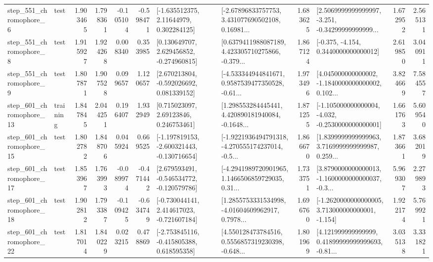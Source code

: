 \begin{tabular}{llrrrrllrlrr}
   step\_551\_chromophore\_6 &      test &      1.903465 &    1.798361 &     -0.105104 & -0.598471 &     [-1.635512375, 2.11644979, 0.302284125] &  [-2.67896833757753, 3.431077690502108, 0.16981... &       1.683625 &  [2.5069999999999997, -3.251, -0.34299999999999... &            1.672952 &          2.565131 \\
   step\_551\_chromophore\_8 &      test &      1.915927 &    1.924268 &      0.008340 &  0.353985 &    [0.130649707, 2.629456852, -0.274960815] &  [0.6379411988087189, 4.423305710275866, -0.379... &       1.867124 &               [-0.375, -4.154, 0.3440000000000012] &            2.619850 &          3.040911 \\
   step\_551\_chromophore\_9 &      test &      1.807871 &    1.907528 &      0.099657 &  1.120657 &    [2.670213804, -0.592026692, 0.081339152] &  [-4.533344944841671, 0.9587539477350528, -0.61... &       1.973496 &  [4.045000000000002, -1.1840000000000002, 0.102... &            3.824669 &          7.584557 \\
  step\_601\_chromophore\_13 &  training &      1.847845 &    2.044251 &      0.196407 &  1.932949 &      [0.715023097, 2.69123846, 0.246753461] &  [1.298553284445441, 4.420890181940084, -0.1648... &       1.871255 &  [-1.105000000000004, -4.032, -0.2530000000000001] &            1.661763 &          5.609540 \\
  step\_601\_chromophore\_15 &      test &      1.802782 &    1.848706 &      0.045924 &  0.669525 &  [-1.197819153, -2.600321443, -0.130716654] &  [-1.9221936494791318, -4.270555174237014, -0.5... &       1.866670 &  [1.8399999999999963, 3.7169999999999987, 0.259... &            1.873661 &          3.682019 \\
  step\_601\_chromophore\_17 &      test &      1.853967 &    1.763993 &     -0.089974 & -0.471442 &   [2.679593491, -0.546534772, -0.120579786] &  [-4.2941989720901965, 1.1466506859729035, 0.31... &       1.733751 &  [3.8790000000000013, -1.1600000000000037, -0.3... &            5.969307 &          2.279893 \\
  step\_601\_chromophore\_18 &      test &      1.902812 &    1.793387 &     -0.109425 & -0.634749 &   [-0.730044141, 2.414617023, -0.721607184] &  [1.2855753331534998, -4.01604609962917, 0.7978... &       1.696760 &   [-1.2620000000000005, 3.713000000000001, -1.154] &            1.922174 &          5.769921 \\
  step\_601\_chromophore\_22 &      test &      1.817014 &    1.840229 &      0.023215 &  0.478869 &   [-2.753845116, -0.415805388, 0.618595358] &  [4.550128473784516, 0.5556857319230398, -0.648... &       1.801969 &  [4.121999999999999, 0.41899999999999693, -0.81... &            3.035138 &          3.331821 \\

\end{tabular}

